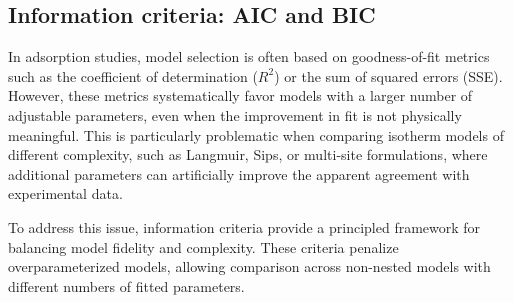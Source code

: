 \documentclass[journal=jacsat,manuscript=article]{achemso}
\begin{document}

\subsection{Information criteria: AIC and BIC}
\label{sec:AIC_BIC}

In adsorption studies, model selection is often based on goodness-of-fit metrics such as the coefficient of determination ($R^2$) or the sum of squared errors (SSE). However, these metrics systematically favor models with a larger number of adjustable parameters, even when the improvement in fit is not physically meaningful. This is particularly problematic when comparing isotherm models of different complexity, such as Langmuir, Sips, or multi-site formulations, where additional parameters can artificially improve the apparent agreement with experimental data.

To address this issue, information criteria provide a principled framework for balancing model fidelity and complexity. These criteria penalize overparameterized models, allowing comparison across non-nested models with different numbers of fitted parameters.
\end{document}
